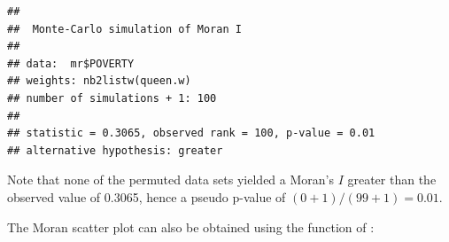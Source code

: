 \begin{knitrout}
\color{fgcolor}\begin{kframe}
\begin{alltt}
\hlstd{(}\hlstd{)}
\hlopt{$}  \hlstd{=} 
            \hlstd{=} \hlstd{)}
\end{alltt}
\begin{verbatim}
## 
## 	Monte-Carlo simulation of Moran I
## 
## data:  mr$POVERTY 
## weights: nb2listw(queen.w)  
## number of simulations + 1: 100 
## 
## statistic = 0.3065, observed rank = 100, p-value = 0.01
## alternative hypothesis: greater
\end{verbatim}
\end{kframe}
\end{knitrout}


Note that none of the permuted data sets yielded a Moran's $I$ greater than the observed value of 0.3065, hence a pseudo p-value of $(0 + 1) / (99 + 1) = 0.01$.

The Moran scatter plot can also be obtained using the function  of :

\begin{knitrout}
\color{fgcolor}\begin{kframe}
\begin{alltt}
\hlopt{$}  \hlstd{=} 
\end{alltt}
\end{kframe}
\end{knitrout}

